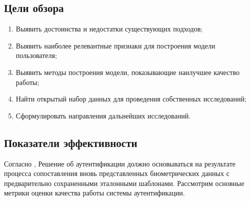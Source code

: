 \documentclass[12pt]{article}
\begin{document}
    \subsection{Цели обзора}
    \label{sec:Overview:Goals}

    \begin{enumerate}
        \item Выявить достоинства и недостатки существующих подходов;
        \item Выявить наиболее релевантные признаки для построения модели пользователя;
        \item Выявить методы построения модели, показывающие наилучшее качество работы;
        \item Найти открытый набор данных для проведения собственных исследований;
        \item Сформулировать направления дальнейших исследований.
    \end{enumerate}


    \subsection{Показатели эффективности}
    \label{sec:Overview:Metrics}

    \par Согласно \cite{BiometricRecognition, BoiometricSecurity}, Решение об аутентификации должно основываться на результате процесса сопоставления вновь представленных биометрических данных с предварительно сохраненными эталонными шаблонами. Рассмотрим основные метрики оценки качества работы системы аутентификации.
\end{document}
